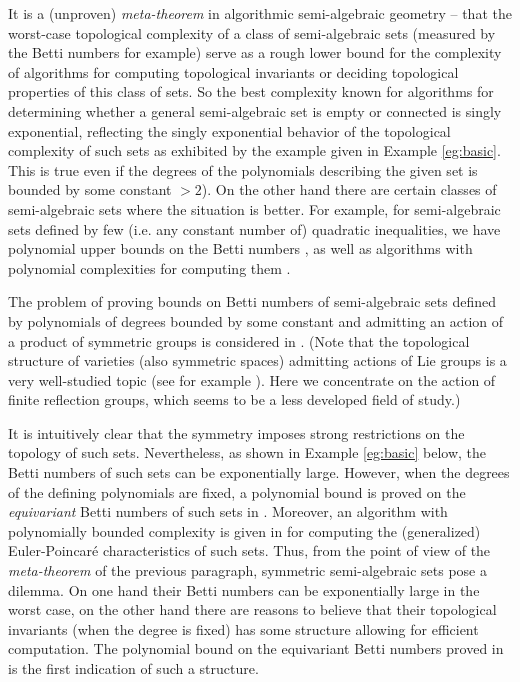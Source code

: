 \documentclass{amsart}
\theoremstyle{definition}
\theoremstyle{remark}
\numberwithin{equation}{section}
\begin{document}
It is a (unproven)  \emph{meta-theorem}  in algorithmic semi-algebraic geometry -- that the worst-case topological complexity of a class of semi-algebraic sets
(measured by the Betti numbers for example)
serve as a rough lower bound for the complexity of algorithms for computing topological
invariants or deciding topological properties of this class of sets.
So the best complexity known for algorithms for determining whether a general semi-algebraic set is empty or connected  is singly exponential, reflecting the singly exponential behavior of the topological
complexity of such sets as exhibited by the example given in Example \ref{eg:basic}. This is true even if the degrees of the
polynomials describing the given set
is bounded by some constant $> 2$). 
On the other hand there are certain classes of semi-algebraic sets where the situation is better.
For example, for semi-algebraic sets defined by few (i.e. any constant number of) quadratic inequalities, we have polynomial upper bounds on the Betti numbers \cite{Bar97}, as well as algorithms 
with polynomial complexities for computing them \cite{BP'R07joa}.

 The problem of proving bounds on Betti numbers of semi-algebraic sets defined by
polynomials of degrees bounded by some constant and admitting an action of 
a product of symmetric groups is considered in \cite{BC2013}. 
(Note that
 the topological structure of varieties (also symmetric spaces) 
admitting actions of Lie groups is a very well-studied
topic (see for example \cite{Mimura-Toda-book}). Here we concentrate on the action of finite reflection groups,
which seems to be a less developed field of study.)

It is intuitively clear that the symmetry imposes strong restrictions on the topology of such sets.
Nevertheless, as shown in Example \ref{eg:basic} below,  the Betti numbers of such sets can be exponentially large.  
However, when the degrees of the defining polynomials are fixed, a polynomial bound is proved on the \emph{equivariant} Betti numbers of such sets in \cite{BC2013}. Moreover, an algorithm with polynomially bounded complexity is
given in \cite{BC2013} for computing the (generalized) Euler-Poincar\'e characteristics of such sets.
Thus, from the point of view of the \emph{meta-theorem} of the previous paragraph, symmetric
semi-algebraic sets pose a dilemma. On one hand their Betti numbers can be exponentially large in the worst case, on the other hand there are reasons to believe that their topological invariants
(when the degree is fixed) has some structure allowing for efficient computation. The polynomial
bound on the equivariant Betti numbers proved in \cite{BC2013} is the first indication of such a
structure.
\end{document}
